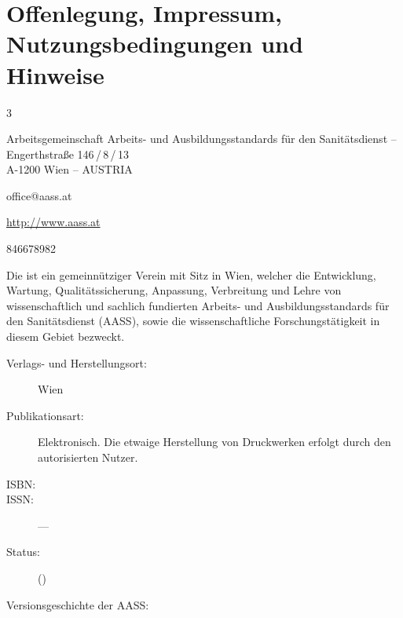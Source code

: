 \section{Offenlegung, Impressum, Nutzungsbedingungen und Hinweise}

\begin{WidePar}

\begin{multicols}{3}

{\noindent\sffamily Arbeitsgemeinschaft Arbeits- und Ausbildungsstandards für
den Sanitätsdienst -- }{\ARGEAASS}
\\
\noindent{}Engerthstraße 146\,/\,8\,/\,13 \\
A-1200 Wien -- AUSTRIA

\begin{compactdesc}
  \item[E-Mail:] office@aass.at
  \item[Homepage:] \url{http://www.aass.at}
  \item[ZVR:] 846678982
\end{compactdesc}

\noindent{}Die {\ARGEAASS} ist ein gemeinnütziger Verein mit Sitz in Wien,
welcher die Entwicklung, Wartung, Qualitätssicherung, Anpassung, Verbreitung und Lehre von
wissenschaftlich und sachlich fundierten Arbeits- und Ausbildungsstandards für
den Sanitätsdienst (AASS), sowie die wissenschaftliche Forschungstätigkeit in
diesem Gebiet bezweckt.


\begin{description}
  \item[Verlags- und Herstellungsort:] Wien
  \item[Publikationsart:] Elektronisch. Die etwaige Herstellung von
  Druckwerken erfolgt durch den autorisierten Nutzer.
  \item[ISBN:] \VarDocIsbn
  \item[ISSN:] ---
  \item[Status:] \DocVersionTyp{} (\DocVersionInfo{})
  \item[Versionsgeschichte der AASS:]~
  

\end{description}
\end{multicols}
\end{WidePar}
